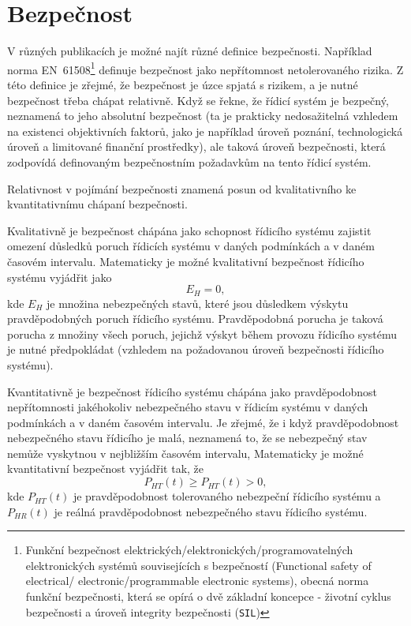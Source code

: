 { \section{Bezpečnost}
    V různých publikacích je možné najít různé definice bezpečnosti. Například norma 
    EN~61508\footnote{Funkční bezpečnost elektrických/elektronických/programovatelných 
    elektronických systémů souvisejících s bezpečností (Functional safety of electrical/ 
    electronic/programmable electronic systems), obecná norma funkční bezpečnosti, která se opírá o 
    dvě základní koncepce - životní cyklus bezpečnosti a úroveň integrity bezpečnosti 
    (\texttt{SIL})} 
    definuje bezpečnost jako nepřítomnost netolerovaného rizika. Z této definice je zřejmé, že 
    bezpečnost je úzce spjatá s rizikem, a je nutné bezpečnost třeba chápat relativně. Když se 
    řekne, že řídicí systém je bezpečný, neznamená to jeho absolutní bezpečnost (ta je prakticky 
    nedosažitelná vzhledem na existenci objektivních faktorů, jako je například úroveň poznání, 
    technologická úroveň a limitované finanční prostředky), ale taková úroveň bezpečnosti, 
    která zodpovídá definovaným bezpečnostním požadavkům na tento řídicí systém. 

    Relativnost v pojímání bezpečnosti znamená posun od kvalitativního ke kvantitativnímu chápaní bezpečnosti.

    Kvalitativně je bezpečnost chápána jako schopnost řídicího systému zajistit omezení důsledků 
    poruch řídicích systému v daných podmínkách a v daném časovém intervalu. Matematicky je možné 
    kvalitativní bezpečnost řídicího systému vyjádřit jako 
    \begin{equation}
      E_H = 0,
    \end{equation}
    kde \(E_H\) je množina nebezpečných stavů, které jsou důsledkem výskytu pravděpodobných poruch 
    řídicího systému. Pravděpodobná porucha je taková porucha z množiny všech poruch, jejichž 
    výskyt během provozu řídicího systému je nutné předpokládat (vzhledem na požadovanou úroveň 
    bezpečnosti řídicího systému).
	
    Kvantitativně je bezpečnost řídicího systému chápána jako pravděpodobnost nepřítomnosti
    jakéhokoliv nebezpečného stavu v řídicím systému v daných podmínkách a v daném časovém
    intervalu. Je zřejmé, že i když pravděpodobnost nebezpečného stavu řídicího je malá, neznamená
    to, že se nebezpečný stav nemůže vyskytnou v nejbližším časovém intervalu, Matematicky je možné
    kvantitativní bezpečnost vyjádřit tak, že
    \begin{equation}
      P_{HT}(t)\geq P_{HT}(t)>0,
    \end{equation}
    kde \(P_{HT}(t)\) je pravděpodobnost tolerovaného nebezpeční řídicího systému a \(P_{HR}(t)\)
    je reálná pravděpodobnost nebezpeč\-ného stavu řídicího systému.
	 
}
